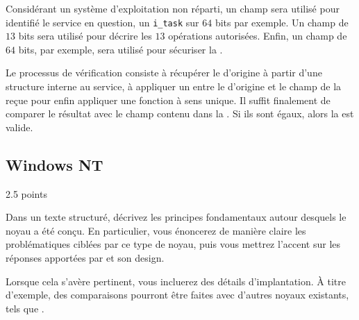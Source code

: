 \begin{correction}

Consid\'erant un syst\`eme d'exploitation non r\'eparti, un champ sera
utilis\'e pour identifi\'e le service en question, un \texttt{i\_task}
sur $64$ bits par exemple. Un champ de $13$ bits sera utilis\'e pour
d\'ecrire les $13$ op\'erations autoris\'ees. Enfin, un champ 
de $64$ bits, par exemple, sera utilis\'e pour s\'ecuriser la
.

Le processus de v\'erification consiste \`a r\'ecup\'erer le 
d'origine \`a partir d'une structure interne au service, \`a appliquer un
 entre le  d'origine et le champ 
de la  re\c{c}ue pour enfin appliquer une fonction
\`a sens unique. Il suffit finalement de comparer le r\'esultat avec le
champ  contenu dans la . Si ils sont
\'egaux, alors la  est valide.

\end{correction}

%
%
\subsection{Windows NT}
{\hfill{} \scriptsize{2.5 points}}

Dans un texte structur\'e, d\'ecrivez les principes fondamentaux autour
desquels le noyau  a \'et\'e con\c{c}u. En particulier, vous
\'enoncerez de mani\`ere claire les probl\'ematiques cibl\'ees par ce type de
noyau, puis vous mettrez l'accent sur les r\'eponses apport\'ees par 
et son design.

Lorsque cela s'av\`ere pertinent, vous incluerez des d\'etails d'implantation.
\`A titre d'exemple, des comparaisons pourront \^etre faites avec d'autres
noyaux existants, tels que .

